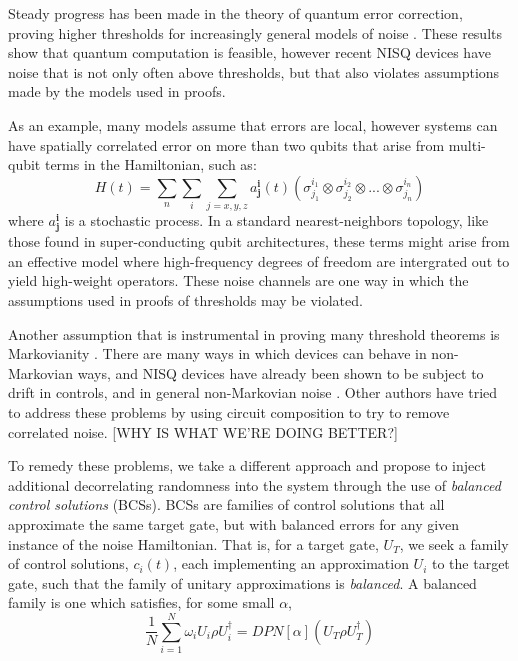 \documentclass[aps,nofootinbib,pra,notitlepage,twocolumn]{revtex4-1}
\begin{document}
Steady progress has been made in the theory of quantum error correction, proving higher thresholds for increasingly general models of noise \cite{Aharonov2006}. These results show that quantum computation is feasible, however recent NISQ \cite{Preskill2018} devices have noise that is not only often above thresholds, but that also violates assumptions made by the models used in proofs.

As an example, many models assume that errors are local, however systems can have spatially correlated error on more than two qubits that arise from multi-qubit terms in the Hamiltonian, such as:
\begin{equation}\label{eq:0}
  H(t) = \sum_{n}\sum_{i}\sum_{j=x,y,z} a^{\textbf{i}}_{\textbf{j}}(t)(\sigma_{j_1}^{i_1}\otimes\sigma_{j_2}^{i_2}\otimes ... \otimes \sigma_{j_n}^{i_n})
\end{equation}
where $a^{\textbf{i}}_{\textbf{j}}$ is a stochastic process. In a standard nearest-neighbors topology, like those found in super-conducting qubit architectures, these terms might arise from an effective model where high-frequency degrees of freedom are intergrated out to yield high-weight operators. These noise channels are one way in which the assumptions used in proofs of thresholds may be violated.

Another assumption that is instrumental in proving many threshold theorems is Markovianity \cite{Kitaev1997}. There are many ways in which devices can behave in non-Markovian ways, and NISQ devices have already been shown to be subject to drift in controls, \cite{Kelly2018} and in general non-Markovian noise \cite{BlumeKohout2017}. Other authors have tried to address these problems \cite{Wallman2016, Campbell2017, Heim2016} by using circuit composition to try to remove correlated noise. [WHY IS WHAT WE'RE DOING BETTER?]

To remedy these problems, we take a different approach and propose to inject additional decorrelating randomness into the system through the use of \emph{balanced control solutions} (BCSs). BCSs are families of control solutions that all approximate the same target gate, but with balanced errors for any given instance of the noise Hamiltonian. That is, for a target gate, $U_T$, we seek a family of control solutions, $c_i(t)$, each implementing an approximation $U_i$ to the target gate, such that the family of unitary approximations is \emph{balanced}. A balanced family is one which satisfies, for some small $\alpha$,
\begin{equation}\label{eq:1}
  \frac{1}{N}\sum_{i=1}^N \omega_i U_i \rho U_i^\dagger = DPN[\alpha]\left(U_T \rho U_T^\dagger \right)
\end{equation}
\end{document}
